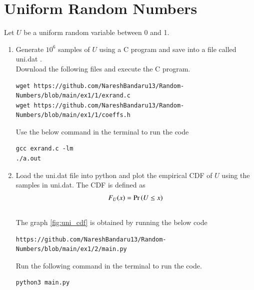 \documentclass[journal,12pt,twocolumn]{IEEEtran}
\renewcommand\thesection{\arabic{section}}
\begin{document}
\section{Uniform Random Numbers}
Let $U$ be a uniform random variable between 0 and 1.
\begin{enumerate}[label=\thesection.\arabic*
,ref=\thesection.\theenumi]
\item Generate $10^6$ samples of $U$ using a C program and save into a file called uni.dat .
\\
\solution Download the following files and execute the  C program.
\begin{lstlisting}
wget https://github.com/NareshBandaru13/Random-Numbers/blob/main/ex1/1/exrand.c
wget https://github.com/NareshBandaru13/Random-Numbers/blob/main/ex1/1/coeffs.h
\end{lstlisting}
Use the below command in the terminal to run the code
\begin{lstlisting}
gcc exrand.c -lm
./a.out
\end{lstlisting}

%
\item
Load the uni.dat file into python and plot the empirical CDF of $U$ using the samples in uni.dat. The CDF is defined as
\begin{align}
F_{U}(x) = \Pr\left(U \le x\right)
\end{align}
\\
\solution 
The graph \ref{fig:uni_cdf} is obtained by running the below code
\begin{lstlisting}
https://github.com/NareshBandaru13/Random-Numbers/blob/main/ex1/2/main.py
\end{lstlisting}
Run the following command in the terminal to run the code.\\
\begin{lstlisting}
python3 main.py
\end{lstlisting}


\end{enumerate}
\end{document}

